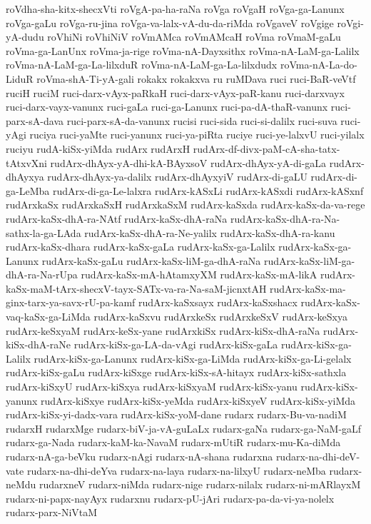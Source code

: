 {roVdha-sha-kitx-shecxVti
roVgA-pa-ha-raNa
roVga
roVgaH
roVga-ga-Lanunx
roVga-gaLu
roVga-ru-jina
roVga-va-lalx-vA-du-da-riMda
roVgaveV
roVgige
roVgi-yA-dudu
roVhiNi
roVhiNiV
roVmAMca
roVmAMcaH
roVma
roVmaM-gaLu
roVma-ga-LanUnx
roVma-ja-rige
roVma-nA-Dayxsithx
roVma-nA-LaM-ga-Lalilx
roVma-nA-LaM-ga-La-lilxduR
roVma-nA-LaM-ga-La-lilxdudx
roVma-nA-La-do-LiduR
roVma-shA-Ti-yA-gali
rokakx
rokakxva
ru
ruMDava
ruci
ruci-BaR-veVtf
ruciH
ruciM
ruci-darx-vAyx-paRkaH
ruci-darx-vAyx-paR-kanu
ruci-darxvayx
ruci-darx-vayx-vanunx
ruci-gaLa
ruci-ga-Lanunx
ruci-pa-dA-thaR-vanunx
ruci-parx-sA-dava
ruci-parx-sA-da-vanunx
rucisi
ruci-sida
ruci-si-dalilx
ruci-suva
ruci-yAgi
ruciya
ruci-yaMte
ruci-yanunx
ruci-ya-piRta
ruciye
ruci-ye-lalxvU
ruci-yilalx
ruciyu
rudA-kiSx-yiMda
rudArx
rudArxH
rudArx-df-divx-paM-cA-sha-tatx-tAtxvXni
rudArx-dhAyx-yA-dhi-kA-BAyxsoV
rudArx-dhAyx-yA-di-gaLa
rudArx-dhAyxya
rudArx-dhAyx-ya-dalilx
rudArx-dhAyxyiV
rudArx-di-gaLU
rudArx-di-ga-LeMba
rudArx-di-ga-Le-lalxra
rudArx-kASxLi
rudArx-kASxdi
rudArx-kASxnf
rudArxkaSx
rudArxkaSxH
rudArxkaSxM
rudArx-kaSxda
rudArx-kaSx-da-va-rege
rudArx-kaSx-dhA-ra-NAtf
rudArx-kaSx-dhA-raNa
rudArx-kaSx-dhA-ra-Na-sathx-la-ga-LAda
rudArx-kaSx-dhA-ra-Ne-yalilx
rudArx-kaSx-dhA-ra-kanu
rudArx-kaSx-dhara
rudArx-kaSx-gaLa
rudArx-kaSx-ga-Lalilx
rudArx-kaSx-ga-Lanunx
rudArx-kaSx-gaLu
rudArx-kaSx-liM-ga-dhA-raNa
rudArx-kaSx-liM-ga-dhA-ra-Na-rUpa
rudArx-kaSx-mA-hAtamxyXM
rudArx-kaSx-mA-likA
rudArx-kaSx-maM-tArx-shecxV-tayx-SATx-va-ra-Na-saM-jicnxtAH
rudArx-kaSx-ma-ginx-tarx-ya-savx-rU-pa-kamf
rudArx-kaSxsayx
rudArx-kaSxshacx
rudArx-kaSx-vaq-kaSx-ga-LiMda
rudArx-kaSxvu
rudArxkeSx
rudArxkeSxV
rudArx-keSxya
rudArx-keSxyaM
rudArx-keSx-yane
rudArxkiSx
rudArx-kiSx-dhA-raNa
rudArx-kiSx-dhA-raNe
rudArx-kiSx-ga-LA-da-vAgi
rudArx-kiSx-gaLa
rudArx-kiSx-ga-Lalilx
rudArx-kiSx-ga-Lanunx
rudArx-kiSx-ga-LiMda
rudArx-kiSx-ga-Li-gelalx
rudArx-kiSx-gaLu
rudArx-kiSxge
rudArx-kiSx-sA-hitayx
rudArx-kiSx-sathxla
rudArx-kiSxyU
rudArx-kiSxya
rudArx-kiSxyaM
rudArx-kiSx-yanu
rudArx-kiSx-yanunx
rudArx-kiSxye
rudArx-kiSx-yeMda
rudArx-kiSxyeV
rudArx-kiSx-yiMda
rudArx-kiSx-yi-dadx-vara
rudArx-kiSx-yoM-dane
rudarx
rudarx-Bu-va-nadiM
rudarxH
rudarxMge
rudarx-biV-ja-vA-guLaLx
rudarx-gaNa
rudarx-ga-NaM-gaLf
rudarx-ga-Nada
rudarx-kaM-ka-NavaM
rudarx-mUtiR
rudarx-mu-Ka-diMda
rudarx-nA-ga-beVku
rudarx-nAgi
rudarx-nA-shana
rudarxna
rudarx-na-dhi-deV-vate
rudarx-na-dhi-deYva
rudarx-na-laya
rudarx-na-lilxyU
rudarx-neMba
rudarx-neMdu
rudarxneV
rudarx-niMda
rudarx-nige
rudarx-nilalx
rudarx-ni-mARlayxM
rudarx-ni-papx-nayAyx
rudarxnu
rudarx-pU-jAri
rudarx-pa-da-vi-ya-nolelx
rudarx-parx-NiVtaM
}
